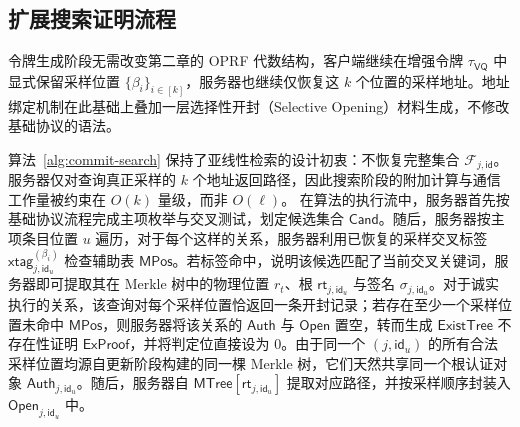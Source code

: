 \subsection{扩展搜索证明流程}
令牌生成阶段无需改变第二章的 OPRF 代数结构，客户端继续在增强令牌 $\tau_{\mathsf{VQ}}$ 中显式保留采样位置 $\{\beta_i\}_{i\in[k]}$，服务器也继续仅恢复这 $k$ 个位置的采样地址。地址绑定机制在此基础上叠加一层选择性开封（Selective Opening）材料生成，不修改基础协议的语法。

算法~\ref{alg:commit-search} 保持了亚线性检索的设计初衷：不恢复完整集合 $\mathcal{F}_{j,\mathsf{id}}$。服务器仅对查询真正采样的 $k$ 个地址返回路径，因此搜索阶段的附加计算与通信工作量被约束在 $O(k)$ 量级，而非 $O(\ell)$。
在算法的执行流中，服务器首先按基础协议流程完成主项枚举与交叉测试，划定候选集合 $\mathsf{Cand}$。随后，服务器按主项条目位置 $u$ 遍历，对于每个这样的关系，服务器利用已恢复的采样交叉标签 $\mathsf{xtag}_{j,\mathsf{id}_u}^{(\beta_i)}$ 检查辅助表 $\mathsf{MPos}$。若标签命中，说明该候选匹配了当前交叉关键词，服务器即可提取其在 Merkle 树中的物理位置 $r_t$、根 $\mathsf{rt}_{j,\mathsf{id}_u}$ 与签名 $\sigma_{j,\mathsf{id}_u}$。对于诚实执行的关系，该查询对每个采样位置恰返回一条开封记录；若存在至少一个采样位置未命中 $\mathsf{MPos}$，则服务器将该关系的 $\mathsf{Auth}$ 与 $\mathsf{Open}$ 置空，转而生成 $\mathsf{ExistTree}$ 不存在性证明 $\mathsf{ExProof}$，并将判定位直接设为 $0$。由于同一个 $(j,\mathsf{id}_u)$ 的所有合法采样位置均源自更新阶段构建的同一棵 Merkle 树，它们天然共享同一个根认证对象 $\mathsf{Auth}_{j,\mathsf{id}_u}$。随后，服务器自 $\mathsf{MTree}[\mathsf{rt}_{j,\mathsf{id}_u}]$ 提取对应路径，并按采样顺序封装入 $\mathsf{Open}_{j,\mathsf{id}_u}$ 中。 

